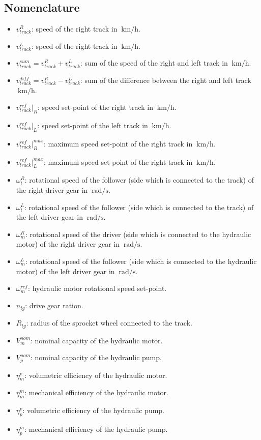 \documentclass[11pt,a4paper,oneside]{book}
\begin{document}
\begin{onehalfspace}
\section{Nomenclature}
\begin{itemize}
	\item[--] $v_{track}^{R}$: speed of the right track in $\SI{}{\kilo\meter\per\hour}$.
	\item[--] $v_{track}^{L}$: speed of the right track in $\SI{}{\kilo\meter\per\hour}$.
	\item[--] $v_{track}^{sum}=v_{track}^{R}+v_{track}^{L}$: sum of the speed of the right and left track in $\SI{}{\kilo\meter\per\hour}$.
	\item[--] $v_{track}^{diff}=v_{track}^{R}-v_{track}^{L}$: sum of the difference between the right and left track $\SI{}{\kilo\meter\per\hour}$.
	\item[--] $v_{track}^{ref}\Big|_{R}$: speed set-point of the right track in $\SI{}{\kilo\meter\per\hour}$.
	\item[--] $v_{track}^{ref}\Big|_{L}$: speed set-point of the left track in $\SI{}{\kilo\meter\per\hour}$.
	\item[--] $v_{track}^{ref}\Big|_{R}^{max}$: maximum speed set-point of the right track in $\SI{}{\kilo\meter\per\hour}$.
	\item[--] $v_{track}^{ref}\Big|_{L}^{max}$: maximum speed set-point of the right track in $\SI{}{\kilo\meter\per\hour}$.
	\item[--] $\omega_l^R$: rotational speed of the follower (side which is connected to the track) of the right driver gear in $\SI{}{\radian\per\second}$.
	\item[--] $\omega_l^L$: rotational speed of the follower (side which is connected to the track) of the left driver gear in $\SI{}{\radian\per\second}$.
	\item[--] $\omega_m^R$: rotational speed of the driver (side which is connected to the hydraulic motor) of the right driver gear in $\SI{}{\radian\per\second}$.
	\item[--] $\omega_m^L$: rotational speed of the follower (side which is connected to the hydraulic motor) of the left driver gear in $\SI{}{\radian\per\second}$.
	\item[--] $\omega_m^{ref}$: hydraulic motor rotational speed set-point.
	\item[--] $n_{tg}$: drive gear ration.
	\item[--] $R_{tg}$: radius of the sprocket wheel connected to the track.
	\item[--] $V_m^{nom}$: nominal capacity of the hydraulic motor.
	\item[--] $V_p^{nom}$: nominal capacity of the hydraulic pump.
	\item[--] $\eta_m^{v}$: volumetric efficiency of the hydraulic motor.
	\item[--] $\eta_m^{m}$: mechanical efficiency of the hydraulic motor.
	\item[--] $\eta_p^{v}$: volumetric efficiency of the hydraulic pump.
	\item[--] $\eta_p^{m}$: mechanical efficiency of the hydraulic pump.
	

\end{itemize}
\end{onehalfspace}
\end{document}

